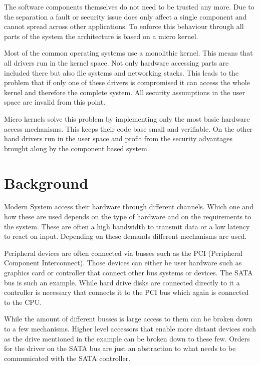 \documentclass[
a4paper,
12pt,
notitlepage,
parskip=half,
DIV=11,
]{scrbook}
\begin{document}
	The software components themselves do not need to be trusted any more.
	Due to the separation a fault or security issue does only affect a single component and cannot spread across other applications.
	To enforce this behaviour through all parts of the system the architecture is based on a micro kernel.
	
	Most of the common operating systems use a monolithic kernel.
	This means that all drivers run in the kernel space.
	Not only hardware accessing parts are included there but also file systems and networking stacks.
	This leads to the problem that if only one of these drivers is compromised it can access the whole kernel and therefore the complete system.
	All security assumptions in the user space are invalid from this point.
	
	Micro kernels solve this problem by implementing only the most basic hardware access mechanisms.
	This keeps their code base small and verifiable.
	On the other hand drivers run in the user space and profit from the security advantages brought along by the component based system.
	
	\chapter{Background} %

	Modern System access their hardware through different channels.
	Which one and how these are used depends on the type of hardware and on the requirements to the system.
	These are often a high bandwidth to transmit data or a low latency to react on input.
	Depending on these demands different mechanisms are used.
	
	Peripheral devices are often connected via busses such as the PCI (Peripheral Component Interconnect).
	Those devices can either be user hardware such as graphics card or controller that connect other bus systems or devices.
	The SATA bus is such an example.
	While hard drive disks are connected directly to it a controller is necessary that connects it to the PCI bus which again is connected to the CPU.
	
	While the amount of different busses is large access to them can be broken down to a few mechanisms.
	Higher level accessors that enable more distant devices such as the drive mentioned in the example can be broken down to these few.
	Orders for the driver on the SATA bus are just an abstraction to what needs to be communicated with the SATA controller. \citep{iosystems}
\end{document}
